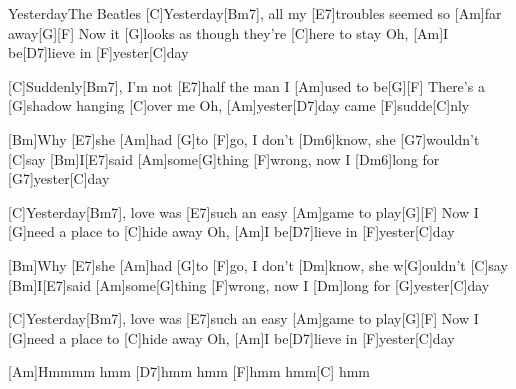 \documentclass[../main.tex]{subfiles}
\begin{document}
\begin{song}[5]{Yesterday}{The Beatles}{}
[C]Yesterday[Bm7],  all my [E7]troubles seemed so [Am]far away[G]{\hh}[F]{\hh}
Now it [G]looks as though they're [C]here to stay
Oh, [Am]I be[D7]lieve in [F]yester[C]day

[C]Suddenly[Bm7],  I'm not [E7]half the man I [Am]used to be[G]{\hh}[F]{\hh}
There's a [G]shadow hanging [C]over me
Oh, [Am]yester[D7]day came [F]sudde[C]nly

[Bm]Why [E7]she [Am]had [G]to [F]go, I don't [Dm6]know, she [G7]wouldn't [C]say
[Bm]I{\hh}[E7]said [Am]some[G]thing [F]wrong, now I [Dm6]long for [G7]yester[C]day

[C]Yesterday[Bm7],  love was [E7]such an easy [Am]game to play[G]{\hh}[F]{\hh}
Now I [G]need a place to [C]hide away
Oh, [Am]I be[D7]lieve in [F]yester[C]day

[Bm]Why [E7]she [Am]had [G]to [F]go, I don't [Dm]know, she w[G]ouldn't [C]say
[Bm]I{\hh}[E7]said [Am]some[G]thing [F]wrong, now I [Dm]long for [G]yester[C]day

[C]Yesterday[Bm7],  love was [E7]such an easy [Am]game to play[G]{\hh}[F]{\hh}
Now I [G]need a place to [C]hide away
Oh, [Am]I be[D7]lieve in [F]yester[C]day

[Am]Hmmmm hmm [D7]hmm hmm [F]hmm hmm[C] hmm

\end{song}
\end{document}
